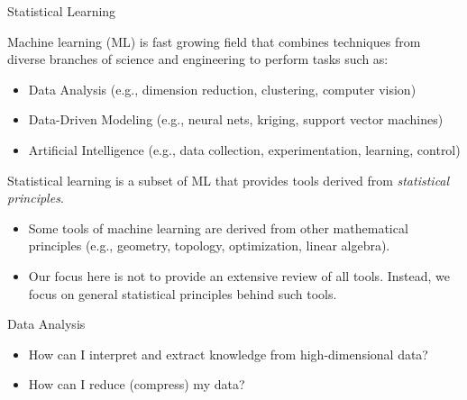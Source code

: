 \documentclass[handout,9pt]{beamer}
\begin{document}
%
\begin{frame}{Statistical Learning}

\begin{block}{}
Machine learning (ML) is fast growing field that combines techniques from diverse branches of science and engineering to perform tasks such as:
\end{block}
\begin{itemize}
\setlength{\itemsep}{10pt}
\item Data Analysis (e.g., dimension reduction, clustering, computer vision)
\item Data-Driven Modeling (e.g., neural nets, kriging, support vector machines)
\item Artificial Intelligence (e.g., data collection, experimentation, learning, control)
\end{itemize}
\begin{block}{}
Statistical learning is a subset of ML that provides tools derived from {\em statistical principles}. 
\end{block}
\begin{itemize}
\setlength{\itemsep}{10pt}
\item Some tools of machine learning are derived from other mathematical principles (e.g., geometry, topology, optimization, linear algebra). 
\item Our focus here is not to provide an extensive review of all tools. Instead, we focus on general statistical principles behind such tools.  
\end{itemize}
\end{frame}


%
\begin{frame}{Data Analysis}

\begin{block}{}
\begin{itemize}
\setlength{\itemsep}{10pt}
\item How can I interpret and extract knowledge from high-dimensional data? 

\item How can I reduce (compress) my data? 
\end{itemize}
\end{block}

\end{frame}
\end{document}
